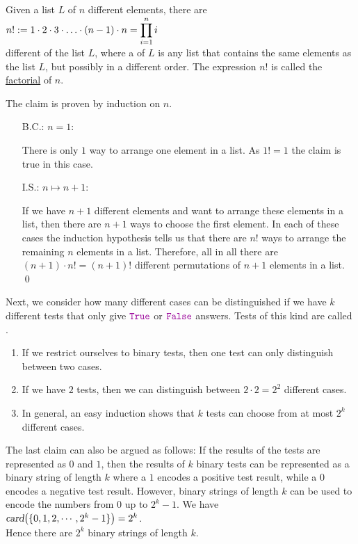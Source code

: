 \begin{Theorem}
Given a list $L$ of $n$ different elements, there are 
\\[0.2cm]
\hspace*{1.3cm}
$\displaystyle n! := 1 \cdot 2 \cdot 3 \cdot {\dots} \cdot (n-1) \cdot n = \prod\limits_{i=1}^n i$ 
\\[0.2cm]
different  of the list $L$, where a   of $L$ is any
list that contains the same elements as the list $L$, but possibly in a different order.
The expression $n!$ is called the
\href{https://en.wikipedia.org/wiki/Factorial}{factorial} of $n$. 
\end{Theorem}
\proof The claim is proven by induction on $n$. 
\begin{enumerate}
\item[B.C.:] $n=1$:  

      There is only $1$ way to arrange one element in a list.  As $1! = 1$ the claim is true in this case.
\item[I.S.:] $n \mapsto n+1$:
  
      If we have $n+1$ different elements and want to arrange these elements in a list, then there
      are $n+1$ ways to choose the first element.  In each of these cases the induction
      hypothesis tells us that there are $n!$ ways to arrange the remaining $n$ elements in a list.
      Therefore, all in all there are $(n+1) \cdot n! = (n+1)!$ different permutations of $n+1$
      elements in a list. \qed
\end{enumerate}
Next, we consider how many different cases can be distinguished if we have $k$ different tests
that only give $\mytt{True}$ or $\mytt{False}$ answers.  Tests of this kind are called .
\begin{enumerate}
\item If we restrict ourselves to binary tests, then one test can only distinguish between two cases.
\item If we have $2$ tests, then we can distinguish between  $2 \cdot 2 = 2^2$ different cases.
\item In general, an easy induction shows that $k$ tests can choose from at most $2^k$ different cases.
\end{enumerate}
The last claim can also be argued as follows:  If the results of the tests are represented as
$0$ and $1$, then the results of $k$ binary tests can be represented as a binary string of length
$k$ where a $1$ encodes a positive test result, while a $0$ encodes a negative test result.
However, binary strings of length $k$ can be used to encode the numbers from $0$ up to
$2^{k}-1$.  We have
\\[0.2cm]
\hspace*{1.3cm}
$\textsl{card}\bigl(\{0,1,2,\cdots, 2^k-1\}\bigr) = 2^k$.
\\[0.2cm]
Hence there are $2^k$ binary strings of length $k$.  

